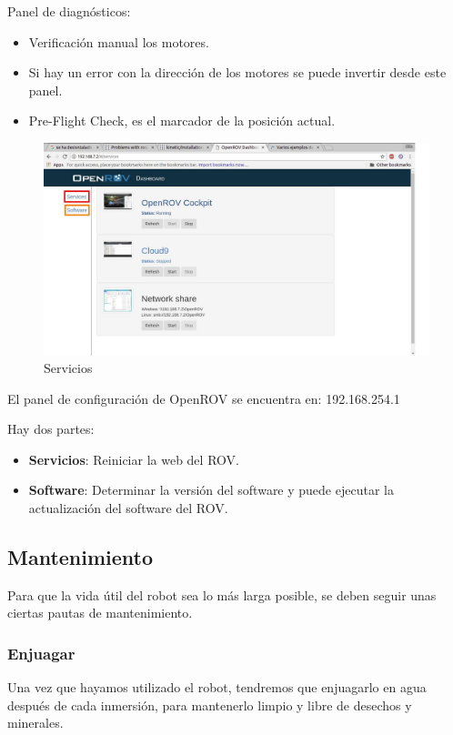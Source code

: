 Panel de diagnósticos:
\begin{itemize}
 \item Verificación manual los motores.
 \item Si hay un error con la dirección de los motores se puede invertir desde este panel.
 \item Pre-Flight Check, es el marcador de la posición actual.
\end{itemize}

\begin{figure} [hbtp]
\begin{center}
  \includegraphics[width=15cm]{img/cap3/3_5/services}
\end{center}
\caption{Servicios}
\label{fig:services}
\end{figure}

El panel de configuración de OpenROV se encuentra en: 192.168.254.1

Hay dos partes:
\begin{itemize}
\item[\textcolor{red}{\textbullet}]\textbf{Servicios}: Reiniciar la web del ROV.
\item[\textcolor{orange}{\textbullet}]\textbf{Software}: Determinar la versión del software y puede ejecutar la actualización del software del ROV.
\end{itemize}

\subsection{Mantenimiento}
\label{subsec:mantenimiento}

Para que la vida útil del robot sea lo más larga posible, se deben seguir unas ciertas pautas de mantenimiento.

\subsubsection{Enjuagar}
\label{subsubsec:enjuagar}
Una vez que hayamos utilizado el robot, tendremos que enjuagarlo en agua después de cada inmersión, para mantenerlo limpio y libre de desechos y minerales.
  
